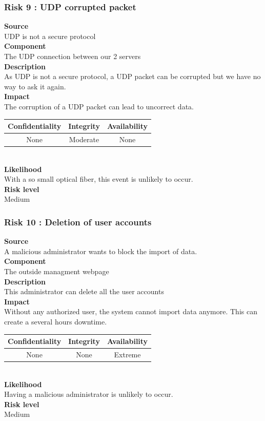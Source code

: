 \documentclass[a4paper,11pt]{article}
\begin{document}
\subsubsection{Risk 9 : UDP corrupted packet}
\textbf{Source} \\UDP is not a secure protocol \\
\textbf{Component} \\The UDP connection between our 2 servers\\
\textbf{Description}\\As UDP is not a secure protocol, a UDP packet can be corrupted but we have no way to ask it again. \\
\textbf{Impact}\\
The corruption of a UDP packet can lead to uncorrect data.\\
\begin{tabular}{|c|c|c|}
\hline
Confidentiality & Integrity & Availability \\
\hline
None & Moderate & None \\
\hline
\end{tabular}\\
\textbf{Likelihood}\\ With a so small optical fiber, this event is unlikely to occur.\\
\textbf{Risk level}\\Medium\\

\subsubsection{Risk 10 : Deletion of user accounts }
\textbf{Source} \\A malicious administrator wants to block the import of data.\\
\textbf{Component} \\The outside managment webpage\\
\textbf{Description}\\This administrator can delete all the user accounts \\
\textbf{Impact}\\
Without any authorized user, the system cannot import data anymore. This can create a several hours downtime. \\
\begin{tabular}{|c|c|c|}
\hline
Confidentiality & Integrity & Availability \\
\hline
None & None & Extreme \\
\hline
\end{tabular}\\
\textbf{Likelihood}\\ Having a malicious administrator is unlikely to occur.\\
\textbf{Risk level}\\Medium\\
\end{document}

